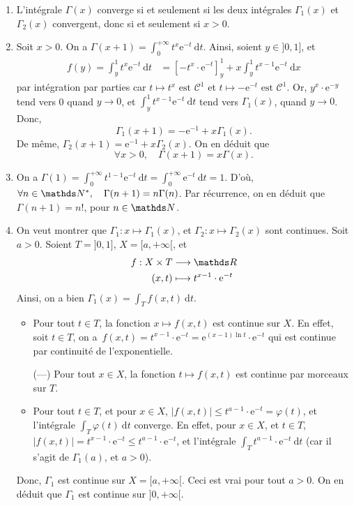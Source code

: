 \begin{exo}
\begin{enumerate}
		\item L'intégrale $\Gamma(x)$\/ converge si et seulement si les deux intégrales $\Gamma_1(x)$\/ et $\Gamma_2(x)$\/ convergent, donc si et seulement si $x > 0$.
		\item Soit $x > 0$. On a $\Gamma(x+1) = \int_{0}^{+\infty} t^{x}\mathrm{e}^{-t}~\mathrm{d}t$. Ainsi, soient $y \in {]0,1]}$, et 
			\begin{align*}
				f(y) = \int_{y}^{1} t^x \mathrm{e}^{-t}~\mathrm{d}t
				&= \left[ -t^x\cdot \mathrm{e}^{-t} \right]_y^1  + x\int_{y}^{1} t^{x-1}\mathrm{e}^{-t}~\mathrm{d}x
			\end{align*}
			par intégration par parties car $t \mapsto t^x  \text{ est } \mathcal{C}^1$ et $t\mapsto -\mathrm{e}^{-t} \text{ est } \mathcal{C}^1$.
			Or, $y^x \cdot \mathrm{e}^{-y}$\/ tend vers 0 quand $y \to 0$, et $\int_{y}^{1} t^{x-1}\mathrm{e}^{-t}~\mathrm{d}t$\/ tend vers $\Gamma_1(x)$, quand $y \to 0$. Donc, \[
				\Gamma_1(x + 1) = -\mathrm{e}^{-1} + x \Gamma_1(x)
			.\] De même, $\Gamma_2(x + 1) = \mathrm{e}^{-1} + x \Gamma_2(x)$. On en déduit que \[
				\forall x > 0,\quad\Gamma(x+1) = x \Gamma(x) 
			.\]
		\item On a $\Gamma(1) = \int_{0}^{+\infty} t^{1-1}\mathrm{e}^{-t}~\mathrm{d}t = \int_{0}^{+\infty} \mathrm{e}^{-t}~\mathrm{d}t = 1$. D'où, $\forall n \in \N^*,\quad \Gamma(n+1) = n \Gamma(n)$.
			Par récurrence, on en déduit que $\Gamma(n+1) = n!$, pour $n \in \N$.
		\item On veut montrer que $\Gamma_1 : x \mapsto \Gamma_1(x)$, et $\Gamma_2 : x \mapsto \Gamma_2(x)$ sont continues. Soit $a>0$. Soient $T = {]0,1]}$, $X = {[a,+\infty[}$, et \begin{align*}
				f: X \times T &\longrightarrow \R \\
				(x,t) &\longmapsto t^{x-1} \cdot \mathrm{e}^{-t}
			\end{align*} Ainsi, on a bien $\Gamma_1(x) = \int_{T} f(x,t) ~\mathrm{d}t$.
			\begin{itemize}
				\item Pour tout $t \in T$, la fonction $x \mapsto f(x,t)$\/ est continue sur $X$. En effet, soit $t \in T$, on a~$f(x,t) = t^{x-1}\cdot \mathrm{e}^{-t} = \mathrm{e}^{(x-1)\ln t}\cdot \mathrm{e}^{-t}$\/ qui est continue par continuité de l'exponentielle.
				\item[\llap(---\rlap)] Pour tout $x \in X$, la fonction $t \mapsto f(x,t)$\/ est continue par morceaux sur $T$.
				\item Pour tout $t \in T$, et pour $x \in X$, $|f(x,t)| \le t^{a-1} \cdot \mathrm{e}^{-t} = \varphi(t)$, et l'intégrale $\int_{T}\varphi(t)~\mathrm{d}t$\/ converge. En effet, pour $x \in X$, et $t \in  T$, $|f(x,t)| = t^{x-1} \cdot \mathrm{e}^{-t} \le t^{a-1} \cdot \mathrm{e}^{-t}$, et l'intégrale $\int_T t^{a-1} \cdot \mathrm{e}^{-t} ~\mathrm{d}t$\/ (car il s'agit de $\Gamma_1(a)$, et $a >0$).
			\end{itemize}
			Donc, $\Gamma_1$\/ est continue sur $X = [a, +\infty[$. Ceci est vrai pour tout $a > 0$. On en déduit que $\Gamma_1$\/ est continue sur $]0,+\infty[$.


\end{enumerate}
\end{exo}
